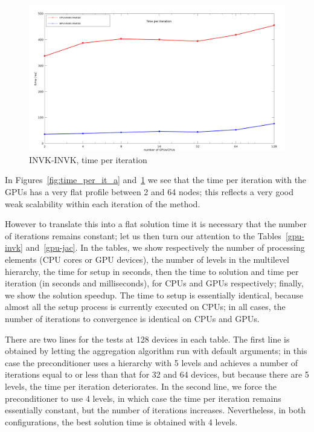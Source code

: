 \begin{figure}[h!]
\centering
\includegraphics[width=1\textwidth]{graf_time_per_it3b.png}
\caption{INVK-INVK, time per iteration\label{fig:time_per_it_b}}
\end{figure}

In Figures~\ref{fig:time_per_it_a} and~\ref{fig:time_per_it_b}
we see that the time per iteration with the GPUs has a very flat profile between 2
and 64 nodes; this reflects a very good weak scalability within each
iteration of the method.

 However to translate this into a flat
solution time it is necessary that the number of iterations remains
constant; let us then turn our attention to the Tables~\ref{gpu-invk}
and~\ref{gpu-jac}. In the tables, we show 
respectively the number of processing elements (CPU cores or GPU
devices), the number of levels in the multilevel hierarchy, the time
for setup in seconds, then the time to solution and time per iteration
(in seconds and milliseconds), for CPUs and GPUs respectively; finally,
we show the solution speedup. The time 
to setup is essentially identical, because  almost all the
setup process is currently executed  on CPUs; in all cases, the number
of iterations to convergence is identical on CPUs and GPUs. 

There are two lines for the tests at 128 devices in each table. 
The first line is obtained by letting the aggregation algorithm run with
default arguments; in this case the preconditioner uses a hierarchy
with 5 levels and achieves a number of iterations equal to or less than
that for 32 and 64 devices, but because there are 5 levels, the time
per iteration deteriorates.  In the second line, we force the
preconditioner to use 4 levels, in which case the time per iteration
remains essentially constant, but the number of iterations
increases. Nevertheless, in both configurations, the best solution
time is obtained with 4 levels. 

